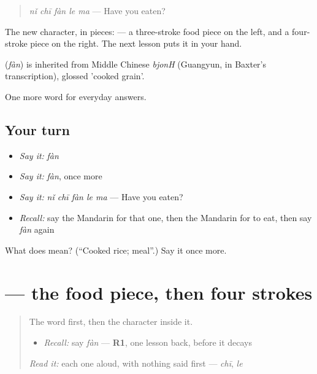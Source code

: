 \begin{quote}
\textbf{} \emph{nǐ chī fàn le ma} — Have you eaten?
\end{quote}

The new character, in pieces:  — a three-stroke food piece on the left, and a four-stroke piece on the right. The next lesson puts it in your hand.

\begin{cousinweb}
\textbf{} (\emph{fàn}) is inherited from Middle Chinese \emph{bjonH} (Guangyun, in Baxter's transcription), glossed 'cooked grain'.
\end{cousinweb}

\begin{grammarlens}[title={What you've built}]
One more word for everyday answers.
\end{grammarlens}

\subsection*{Your turn}
\begin{itemize}
\raggedright
  \item \emph{Say it:} \emph{fàn}
  \item \emph{Say it:} \emph{fàn}, once more
  \item \emph{Say it:} \emph{nǐ chī fàn le ma} — Have you eaten?
  \item \emph{Recall:} say the Mandarin for that one, then the Mandarin for to eat, then say \emph{fàn} again
\end{itemize}

\begin{tcolorbox}[breakable,colback=teal!4,colframe=teal!35!black,title={Before you move on}]
What does  mean? (\textquotedblleft{}Cooked rice; meal\textquotedblright{}.) Say it once more.
\end{tcolorbox}
\section[\texorpdfstring{\zh{饭} (fàn)}{饭 (fàn)}]{ — the food piece, then four strokes}

\label{lesson:ZH-W38-fan}



\begin{quote}
The word first, then the character inside it.

\begin{itemize}
\raggedright
  \item \emph{Recall:} say \emph{fàn} — \textbf{R1}, one lesson back, before it decays
\end{itemize}

\begin{quote}
 
\end{quote}

\emph{Read it:} each one aloud, with nothing said first — \emph{chī}, \emph{le}
\end{quote}

